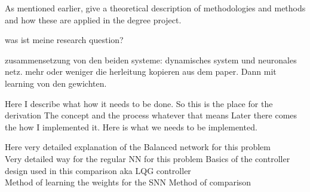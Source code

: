 As mentioned earlier, give a theoretical description of methodologies and methods and how these are applied in the degree project.


was ist meine research question?

zusammensetzung von den beiden systeme: dynamisches system und neuronales netz. mehr oder weniger die herleitung kopieren aus dem paper. Dann mit learning von den gewichten.





Here I describe what how it needs to be done.
So this is the place for the derivation
The concept and the process whatever that means
Later there comes the how I implemented it.
Here is what we needs to be implemented.



Here very detailed explanation of the Balanced network for this problem\\
Very detailed way for the regular NN for this problem
Basics of the controller design used in this comparison aka LQG controller\\
Method of learning the weights for the SNN
Method of comparison\\